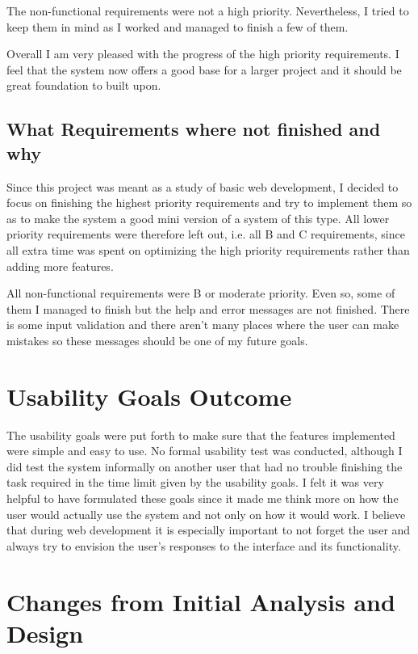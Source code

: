 \documentclass[paper=a4, fontsize=11pt]{scrartcl} %
\numberwithin{equation}{section} %
\numberwithin{figure}{section} %
\numberwithin{table}{section} %
\begin{document}
The non-functional requirements were not a high priority. Nevertheless, I tried to keep them in mind as I worked and managed to finish a few of them.

Overall I am very pleased with the progress of the high priority requirements. I feel that the system now offers a good base for a larger project and it should be great foundation to built upon.

\subsection{What Requirements where not finished and why}
Since this project was meant as a study of basic web development, I decided to focus on finishing the highest priority requirements and try to implement them so as to make the system a good mini version of a system of this type. All lower priority requirements were therefore left out, i.e. all B and C requirements, since all extra time was spent on optimizing the high priority requirements rather than adding more features.

All non-functional requirements were B or moderate priority. Even so, some of them I managed to finish but the help and error messages are not finished. There is some input validation and there aren't many places where the user can make mistakes so these messages should be one of my future goals.

\section{Usability Goals Outcome}
The usability goals were put forth to make sure that the features implemented were simple and easy to use. No formal usability test was conducted, although I did test the system informally on another user that had no trouble finishing the task required in the time limit given by the usability goals. I felt it was very helpful to have formulated these goals since it made me think more on how the user would actually use the system and not only on how it would work. I believe that during web development it is especially important to not forget the user and always try to envision the user’s responses to the interface and its functionality.

\section{Changes from Initial Analysis and Design}
\end{document}
